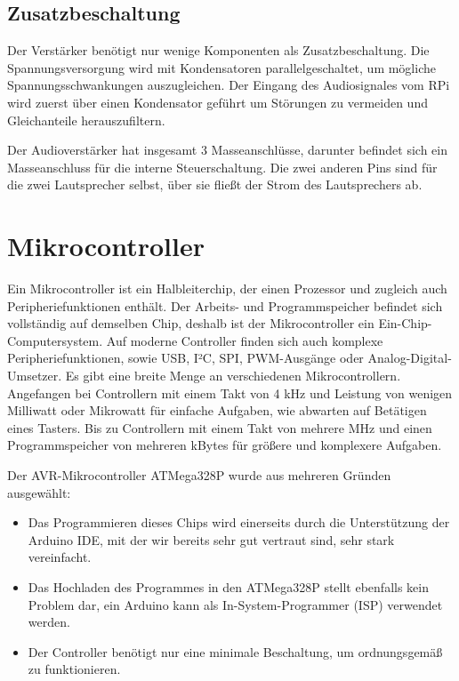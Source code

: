 \subsection{Zusatzbeschaltung}
Der Verstärker benötigt nur wenige Komponenten als Zusatzbeschaltung.
Die Spannungsversorgung wird mit Kondensatoren parallelgeschaltet, um mögliche Spannungsschwankungen auszugleichen.
Der Eingang des Audiosignales vom RPi wird zuerst über einen Kondensator geführt um Störungen zu vermeiden und Gleichanteile herauszufiltern.\par

Der Audioverstärker hat insgesamt 3 Masseanschlüsse, darunter befindet sich ein Masseanschluss für die interne Steuerschaltung.
Die zwei anderen Pins sind für die zwei Lautsprecher selbst, über sie fließt der Strom des Lautsprechers ab.

\section{Mikrocontroller}
Ein Mikrocontroller ist ein Halbleiterchip, der einen Prozessor und zugleich auch Peripheriefunktionen enthält.
Der Arbeits- und Programmspeicher befindet sich vollständig auf demselben Chip, deshalb ist der Mikrocontroller ein Ein-Chip-Computersystem.
Auf moderne Controller finden sich auch komplexe Peripheriefunktionen, sowie USB, I²C, SPI, PWM-Ausgänge oder Analog-Digital-Umsetzer.
Es gibt eine breite Menge an verschiedenen Mikrocontrollern.
Angefangen bei Controllern mit einem Takt von 4 kHz und Leistung von wenigen Milliwatt oder Mikrowatt für einfache Aufgaben, wie abwarten auf Betätigen eines Tasters.
Bis zu Controllern mit einem Takt von mehrere MHz und einen Programmspeicher von mehreren kBytes für größere und komplexere Aufgaben.\par

Der AVR-Mikrocontroller ATMega328P wurde aus mehreren Gründen ausgewählt:
\begin{itemize}
	\item Das Programmieren dieses Chips wird einerseits durch die Unterstützung der Arduino IDE, mit der wir bereits sehr gut vertraut sind, sehr stark vereinfacht.
	\item Das Hochladen des Programmes in den ATMega328P stellt ebenfalls kein Problem dar, ein Arduino kann als In-System-Programmer (ISP) verwendet werden.
	\item Der Controller benötigt nur eine minimale Beschaltung, um ordnungsgemäß zu funktionieren.
\end{itemize}


